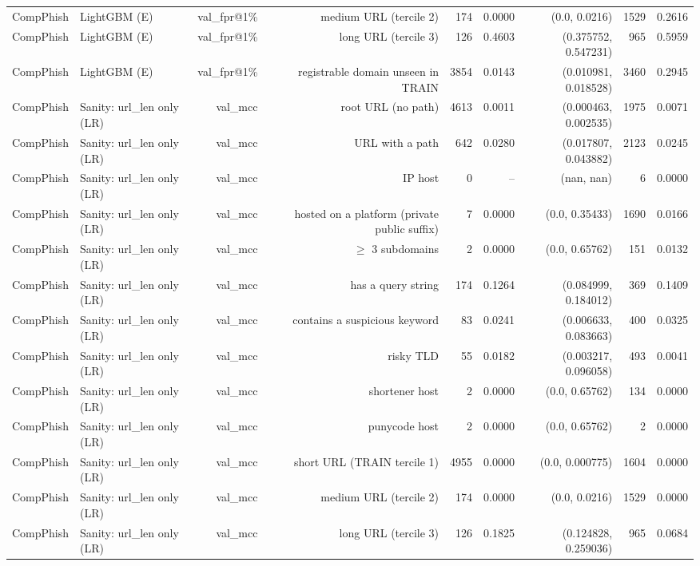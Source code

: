 \begin{table}[t]
\begin{tabular}{llrrrrrrr}
CompPhish & LightGBM (E) & val\_fpr@1\% & medium URL (tercile 2) & 174 & 0.0000 & (0.0, 0.0216) & 1529 & 0.2616 \\
CompPhish & LightGBM (E) & val\_fpr@1\% & long URL (tercile 3) & 126 & 0.4603 & (0.375752, 0.547231) & 965 & 0.5959 \\
CompPhish & LightGBM (E) & val\_fpr@1\% & registrable domain unseen in TRAIN & 3854 & 0.0143 & (0.010981, 0.018528) & 3460 & 0.2945 \\
CompPhish & Sanity: url\_len only (LR) & val\_mcc & root URL (no path) & 4613 & 0.0011 & (0.000463, 0.002535) & 1975 & 0.0071 \\
CompPhish & Sanity: url\_len only (LR) & val\_mcc & URL with a path & 642 & 0.0280 & (0.017807, 0.043882) & 2123 & 0.0245 \\
CompPhish & Sanity: url\_len only (LR) & val\_mcc & IP host & 0 & -- & (nan, nan) & 6 & 0.0000 \\
CompPhish & Sanity: url\_len only (LR) & val\_mcc & hosted on a platform (private public suffix) & 7 & 0.0000 & (0.0, 0.35433) & 1690 & 0.0166 \\
CompPhish & Sanity: url\_len only (LR) & val\_mcc & $\geq$ 3 subdomains & 2 & 0.0000 & (0.0, 0.65762) & 151 & 0.0132 \\
CompPhish & Sanity: url\_len only (LR) & val\_mcc & has a query string & 174 & 0.1264 & (0.084999, 0.184012) & 369 & 0.1409 \\
CompPhish & Sanity: url\_len only (LR) & val\_mcc & contains a suspicious keyword & 83 & 0.0241 & (0.006633, 0.083663) & 400 & 0.0325 \\
CompPhish & Sanity: url\_len only (LR) & val\_mcc & risky TLD & 55 & 0.0182 & (0.003217, 0.096058) & 493 & 0.0041 \\
CompPhish & Sanity: url\_len only (LR) & val\_mcc & shortener host & 2 & 0.0000 & (0.0, 0.65762) & 134 & 0.0000 \\
CompPhish & Sanity: url\_len only (LR) & val\_mcc & punycode host & 2 & 0.0000 & (0.0, 0.65762) & 2 & 0.0000 \\
CompPhish & Sanity: url\_len only (LR) & val\_mcc & short URL (TRAIN tercile 1) & 4955 & 0.0000 & (0.0, 0.000775) & 1604 & 0.0000 \\
CompPhish & Sanity: url\_len only (LR) & val\_mcc & medium URL (tercile 2) & 174 & 0.0000 & (0.0, 0.0216) & 1529 & 0.0000 \\
CompPhish & Sanity: url\_len only (LR) & val\_mcc & long URL (tercile 3) & 126 & 0.1825 & (0.124828, 0.259036) & 965 & 0.0684 \\

\end{tabular}
\end{table}
